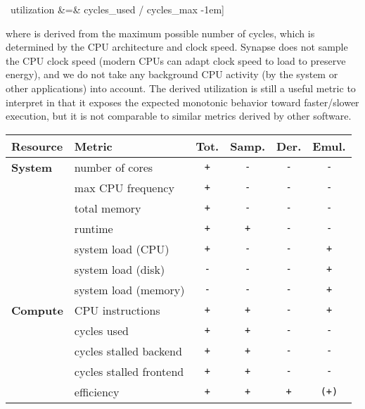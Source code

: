 \documentclass[10pt, conference, compsocconf]{IEEEtran}
\newcommand{\B}[1]{\textbf{#1}\xspace}
\newcommand{\T}[1]{\texttt{#1}\xspace}
\newcommand{\synapse}{Synapse\xspace}
\begin{document}
 \
     utilization &=& cycles_{used} / cycles_{max}
 -1em]

 \noindent
 where  is derived from the maximum possible number of
 cycles, which is determined by the CPU architecture and clock speed.
 \synapse does not sample the CPU clock speed (modern CPUs can adapt
 clock speed to load to preserve energy), and we do not take any
 background CPU activity (by the system or other applications) into
 account.  The derived utilization is still a useful metric to
 interpret in that it exposes the expected monotonic behavior toward
 faster/slower execution, but it is not comparable to similar metrics
 derived by other software.

 \begin{table}[t]
  \begin{center}
   \begin{tabular}{llcccc}
    \toprule
    \B{Resource} & \B{Metric}              & \B{Tot.} & \B{Samp.} & \B{Der.} & \B{Emul.}\\\midrule
    \B{System }  & number of cores         &  \T{ + } &   \T{ - } &  \T{ - } &  \T{ - } \\
                 & max CPU frequency       &  \T{ + } &   \T{ - } &  \T{ - } &  \T{ - } \\
                 & total memory            &  \T{ + } &   \T{ - } &  \T{ - } &  \T{ - } \\
                 & runtime                 &  \T{ + } &   \T{ + } &  \T{ - } &  \T{ - } \\
                 & system load (CPU)       &  \T{ + } &   \T{ - } &  \T{ - } &  \T{ + } \\
                 & system load (disk)      &  \T{ - } &   \T{ - } &  \T{ - } &  \T{ + } \\
                 & system load (memory)    &  \T{ - } &   \T{ - } &  \T{ - } &  \T{ + } \\\midrule
    \B{Compute}  & CPU instructions        &  \T{ + } &   \T{ + } &  \T{ - } &  \T{ + } \\
                 & cycles used             &  \T{ + } &   \T{ + } &  \T{ - } &  \T{ - } \\
                 & cycles stalled backend  &  \T{ + } &   \T{ + } &  \T{ - } &  \T{ - } \\
                 & cycles stalled frontend &  \T{ + } &   \T{ + } &  \T{ - } &  \T{ - } \\
                 & efficiency              &  \T{ + } &   \T{ + } &  \T{ + } &  \T{(+)} \\

\end{tabular}
\end{center}
\end{table}
\end{document}
